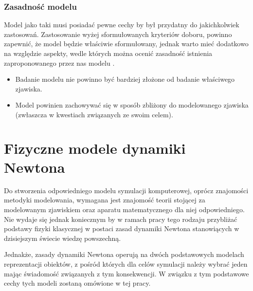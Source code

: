 \subsubsection{Zasadność modelu}
\par{
Model jako taki musi posiadać pewne cechy by był przydatny do jakichkolwiek zastosowań. Zastosowanie wyżej sformułowanych kryteriów doboru, powinno zapewnić, że model będzie właściwie sformułowany, jednak warto mieć dodatkowo na względzie  aspekty, wedle których można ocenić zasadność istnienia zaproponowanego przez nas modelu \cite{WykladyJanczewski}.
\begin{itemize}
\renewcommand{\labelitemi}{$\bullet$}
\item Badanie modelu nie powinno być bardziej złożone od badanie właściwego zjawiska.
\item Model powinien zachowywać się w sposób zbliżony do modelowanego zjawiska (zwłaszcza w kwestiach związanych ze swoim celem).
\end{itemize}
}


\section[Fizyczne modele dynamiki Newtona][Fizyczne modele dynamiki Newtona]{Fizyczne modele dynamiki Newtona}

\par{
Do stworzenia odpowiedniego modelu symulacji komputerowej, oprócz znajomości metodyki modelowania, wymagana jest znajomość teorii stojącej za modelowanym zjawiskiem oraz aparatu matematycznego dla niej odpowiedniego. Nie wydaje się jednak koniecznym by w ramach pracy tego rodzaju przybliżać podstawy fizyki klasycznej w postaci zasad dynamiki Newtona stanowiących w dzisiejszym świecie wiedzę powszechną.
}
\par{
Jednakże, zasady dynamiki Newtona operują na dwóch podstawowych modelach reprezentacji obiektów, z pośród których dla celów symulacji należy wybrać jeden mając świadomość związanych z tym konsekwencji. W związku z tym podstawowe cechy tych modeli zostaną omówione w tej pracy.
}

